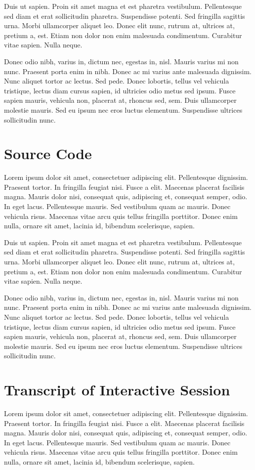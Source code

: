 \documentclass[11pt,letterpaper,onecolumn,twoside,openright,final]{report}
\begin{document}
Duis ut sapien.
Proin sit amet magna et est pharetra vestibulum.
Pellentesque sed diam et erat sollicitudin pharetra.
Suspendisse potenti.
Sed fringilla sagittis urna.
Morbi ullamcorper aliquet leo.
Donec elit nunc, rutrum at, ultrices at, pretium a, est.
Etiam non dolor non enim malesuada condimentum.
Curabitur vitae sapien.
Nulla neque.

Donec odio nibh, varius in, dictum nec, egestas in, nisl.
Mauris varius mi non nunc.
Praesent porta enim in nibh.
Donec ac mi varius ante malesuada dignissim.
Nunc aliquet tortor ac lectus.
Sed pede.
Donec lobortis, tellus vel vehicula tristique, lectus diam cursus sapien, id ultricies odio metus sed ipsum.
Fusce sapien mauris, vehicula non, placerat at, rhoncus sed, sem.
Duis ullamcorper molestie mauris.
Sed eu ipsum nec eros luctus elementum.
Suspendisse ultrices sollicitudin nunc.


\chapter{Source Code}
Lorem ipsum dolor sit amet, consectetuer adipiscing elit. Pellentesque dignissim.
Praesent tortor.
In fringilla feugiat nisi.
Fusce a elit.
Maecenas placerat facilisis magna.
Mauris dolor nisi, consequat quis, adipiscing et, consequat semper, odio.
In eget lacus.
Pellentesque mauris.
Sed vestibulum quam ac mauris.
Donec vehicula risus.
Maecenas vitae arcu quis tellus fringilla porttitor.
Donec enim nulla, ornare sit amet, lacinia id, bibendum scelerisque, sapien.

Duis ut sapien.
Proin sit amet magna et est pharetra vestibulum.
Pellentesque sed diam et erat sollicitudin pharetra.
Suspendisse potenti.
Sed fringilla sagittis urna.
Morbi ullamcorper aliquet leo.
Donec elit nunc, rutrum at, ultrices at, pretium a, est.
Etiam non dolor non enim malesuada condimentum.
Curabitur vitae sapien.
Nulla neque.

Donec odio nibh, varius in, dictum nec, egestas in, nisl.
Mauris varius mi non nunc.
Praesent porta enim in nibh.
Donec ac mi varius ante malesuada dignissim.
Nunc aliquet tortor ac lectus.
Sed pede.
Donec lobortis, tellus vel vehicula tristique, lectus diam cursus sapien, id ultricies odio metus sed ipsum.
Fusce sapien mauris, vehicula non, placerat at, rhoncus sed, sem.
Duis ullamcorper molestie mauris.
Sed eu ipsum nec eros luctus elementum.
Suspendisse ultrices sollicitudin nunc.


\chapter{Transcript of Interactive Session}
Lorem ipsum dolor sit amet, consectetuer adipiscing elit. Pellentesque dignissim.
Praesent tortor.
In fringilla feugiat nisi.
Fusce a elit.
Maecenas placerat facilisis magna.
Mauris dolor nisi, consequat quis, adipiscing et, consequat semper, odio.
In eget lacus.
Pellentesque mauris.
Sed vestibulum quam ac mauris.
Donec vehicula risus.
Maecenas vitae arcu quis tellus fringilla porttitor.
Donec enim nulla, ornare sit amet, lacinia id, bibendum scelerisque, sapien.
\end{document}
